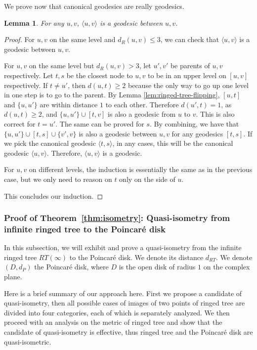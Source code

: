 \documentclass[11pt]{article}
\newtheorem{lem}{Lemma}
\begin{document}
We prove now that canonical geodesics are really geodesics.

\begin{lem}\label{lem:canonical-geodesics-well-defined}
For any $u,v$, $\langle u,v \rangle$ is a geodesic between $u,v$.
\end{lem}

\begin{proof}
For $u,v$ on the same level and $d_R(u,v) \leq 3$, we can check that $\langle u,v \rangle$ is a geodesic between $u,v$.

For $u,v$ on the same level but $d_R(u,v) > 3$, let $u', v'$ be parents of $u,v$ respectively. Let $t, s$ be the closest node to $u,v$ to be in an upper level on $[u,v]$ respectively. If $t \neq u'$, then $d(u,t) \geq 2$ because the only way to go up one level in one step is to go to the parent. By Lemma \ref{lem:ringed-tree-flipping}, $[u,t]$ and $\{ u,u' \}$ are within distance $1$ to each other. Therefore $d(u',t)=1$, as $d(u,t) \geq 2$, and $\{u, u' \} \cup [t,v]$ is also a geodesic from $u$ to $v$. This is also correct for $t=u'$. The same can be proved for $s$. By combining, we have that $\{u, u' \} \cup [t,s] \cup \{ v', v \}$ is also a geodesic between $u,v$ for any geodesics $[t,s]$. If we pick the canonical geodesic $\langle t, s \rangle$, in any cases, this will be the canonical geodesic $\langle u, v \rangle$. Therefore, $\langle u, v \rangle$ is a geodesic.

For $u,v$ on different levels, the induction is essentially the same as in the previous case, but we only need to reason on $t$ only on the side of $u$.

This concludes our induction.
\end{proof}

\subsubsection{Proof of Theorem~\ref{thm:isometry}: 
	Quasi-isometry from infinite ringed tree to 
	the Poincar\'{e} disk}

In this subsection, we will exhibit and prove a quasi-isometry from the
	infinite ringed tree $RT(\infty)$ to the Poincar\'{e} disk. 
We denote its distance $d_{RT}$. We denote $(D,d_{P})$ the Poincar\'{e} disk, 
	where $D$ is the open disk of radius $1$ on the complex plane.

Here is a brief summary of our approach here. First we propose a candidate of quasi-isometry, then all possible cases of images of two points of ringed tree are divided into four categories, each of which
	is separately analyzed. We then proceed with an analysis on the metric of ringed tree and show that the candidate of quasi-isometry is effective, thus ringed tree and the Poincar\'{e} disk are quasi-isometric.
\end{document}
